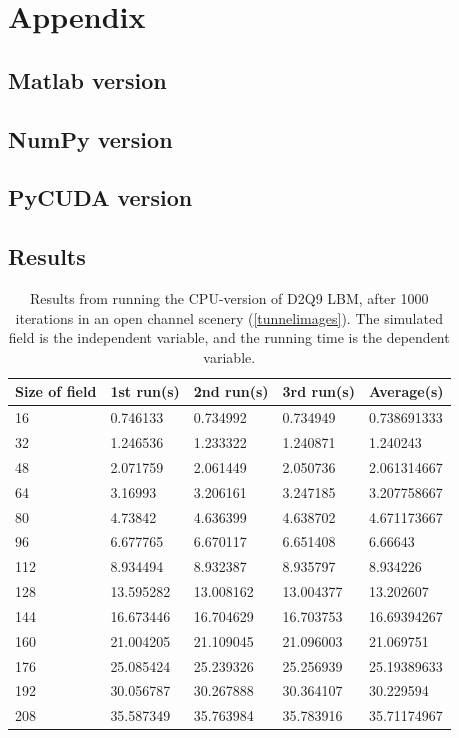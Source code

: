\section{Appendix}

\subsection{Matlab version}


\newpage
\subsection{NumPy version}


\newpage
\subsection{PyCUDA version}



\subsection{Results}
\begin{table}[H]
\centering
\begin{tabular}{lllll}
\toprule
Size	 of field &1st run(s)&	2nd run(s)&	3rd run(s) &	Average(s)\\
\midrule
16&	0.746133&	0.734992&	0.734949&	0.738691333\\
32&	1.246536&	1.233322&	1.240871&	1.240243\\
48&	2.071759&	2.061449&	2.050736&	2.061314667\\
64&	3.16993&		3.206161&	3.247185&	3.207758667\\
80&	4.73842&		4.636399&	4.638702&	4.671173667\\
96&	6.677765&	6.670117&	6.651408&	6.66643\\
112&	8.934494&	8.932387&	8.935797&	8.934226\\
128&	13.595282&	13.008162&	13.004377&	13.202607\\
144&	16.673446&	16.704629&	16.703753&	16.69394267\\
160&	21.004205&	21.109045&	21.096003&	21.069751\\
176&	25.085424&	25.239326&	25.256939&	25.19389633\\
192&	30.056787&	30.267888&	30.364107&	30.229594\\
208&	35.587349&	35.763984&	35.783916&	35.71174967\\
\bottomrule
\end{tabular}
\caption{Results from running the CPU-version of D2Q9 LBM, after 1000 iterations in an open channel scenery (\autoref{tunnelimages}). The simulated field is the independent variable, and the running time is the dependent variable.}
\label{resultcpu}
\end{table}


